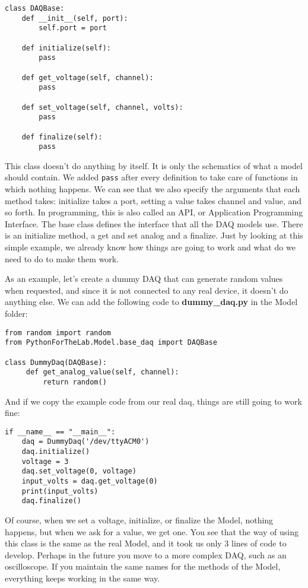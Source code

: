 \begin{verbatim}
class DAQBase:
    def __init__(self, port):
        self.port = port

    def initialize(self):
        pass

    def get_voltage(self, channel):
        pass

    def set_voltage(self, channel, volts):
        pass

    def finalize(self):
        pass
\end{verbatim}

This class doesn't do anything by itself. It is only the schematics of what a model should contain. We added \texttt{pass} after every definition to take care of functions in which nothing happens. We can see that we also specify the arguments that each method takes: initialize takes a port, setting a value takes channel and value, and so forth. In programming, this is also called an API, or Application Programming Interface. The base class defines the interface that all the DAQ models use. There is an initialize method, a get and set analog and a finalize. Just by looking at this simple example, we already know how things are going to work and what do we need to do to make them work.

As an example, let's create a dummy DAQ that can generate random values when requested, and since it is not connected to any real device, it doesn't do anything else. We can add the following code to \textbf{dummy\_daq.py} in the Model folder:

\begin{verbatim}
from random import random
from PythonForTheLab.Model.base_daq import DAQBase

class DummyDaq(DAQBase):
     def get_analog_value(self, channel):
         return random()
\end{verbatim}

And if we copy the example code from our real daq, things are still going to work fine:

\begin{verbatim}
if __name__ == "__main__":
    daq = DummyDaq('/dev/ttyACM0')
    daq.initialize()
    voltage = 3
    daq.set_voltage(0, voltage)
    input_volts = daq.get_voltage(0)
    print(input_volts)
    daq.finalize()
\end{verbatim}

Of course, when we set a voltage, initialize, or finalize the Model, nothing happens, but when we ask for a value, we get one. You see that the way of using this class is the same as the real Model, and it took us only 3 lines of code to develop. Perhaps in the future you move to a more complex DAQ, such as an oscilloscope. If you maintain the same names for the methods of the Model, everything keeps working in the same way.

